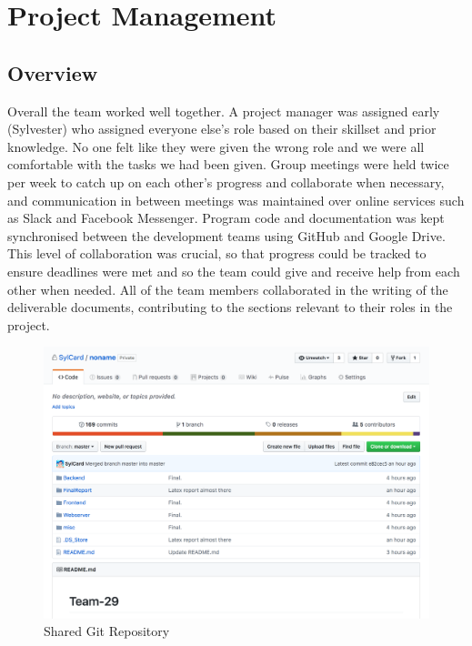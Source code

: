 \documentclass[12pt]{article}
\begin{document}
\section{Project Management}
  \subsection{Overview}
  Overall the team worked well together. A project manager was assigned early (Sylvester) who assigned everyone else’s role based on their skillset and prior knowledge. No one felt like they were given the wrong role and we were all comfortable with the tasks we had been given.
  Group meetings were held twice per week to catch up on each other’s progress and collaborate when necessary, and communication in between meetings was maintained over online services such as Slack and Facebook Messenger. Program code and documentation was kept synchronised between the development teams using GitHub and Google Drive. This level of collaboration was crucial, so that progress could be tracked to ensure deadlines were met and so the team could give and receive help from each other when needed.
  All of the team members collaborated in the writing of the deliverable documents, contributing to the sections relevant to their roles in the project.
  \begin{figure}[H]
  \centering
  \includegraphics[width=120mm]{git.png}
  \caption{Shared Git Repository}
  \end{figure}
\end{document}
